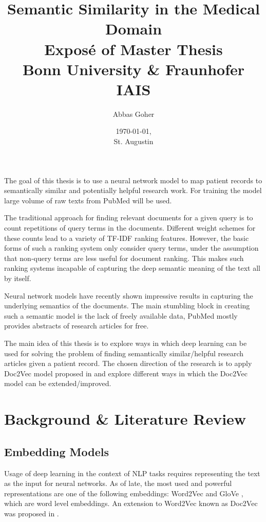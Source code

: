 \documentclass[12pt,a4paper] {article}
\begin{document}
	
	\title{Semantic Similarity in the Medical Domain \\ \hphantom \newline
		\large     Expos\'{e} of Master Thesis
		\\Bonn University \& Fraunhofer IAIS}
	\author{Abbas Goher}
	\date{ \today, \\ St. Augustin}
	\maketitle
	
	The goal of this thesis is to use a neural network model to map patient records to semantically similar and potentially helpful research work. For training the model large volume of raw texts from PubMed \cite{pubmed}  will be used.
	
	
	The traditional approach for finding relevant documents for a given query is to count repetitions of query terms in the documents. Different weight schemes for these counts lead to a variety of TF-IDF ranking features. However, the basic forms of such a ranking system only consider query terms, under the assumption that non-query terms are less useful for document ranking. This makes such ranking systems incapable of capturing the deep semantic meaning of the text all by itself. 
	
	Neural network models have recently shown impressive results in capturing the underlying semantics of the documents\cite{Bengio2006}.
	The main stumbling block in creating such a semantic model is the lack of freely available data, PubMed mostly provides abstracts of research articles for free. 
	
	The main idea of this thesis is to explore ways in which deep learning can be used for solving the problem of finding semantically similar/helpful research articles given a patient record. The chosen direction of the research is to apply Doc2Vec model proposed in \cite{le2014distributed} and explore different ways in which the Doc2Vec model can be extended/improved.
	
	\section*{Background \& Literature Review}
	
	\subsection*{Embedding Models}
	Usage of deep learning in the context of NLP tasks requires representing the text as the input for neural networks. As of late, the most used and powerful representations are one of the following embeddings: Word2Vec \cite{mikolov2013efficient} and GloVe \cite{pennington2014glove}, which are word level embeddings. An extension to Word2Vec known as Doc2Vec was proposed in \cite{le2014distributed}.  
	
\end{document}
